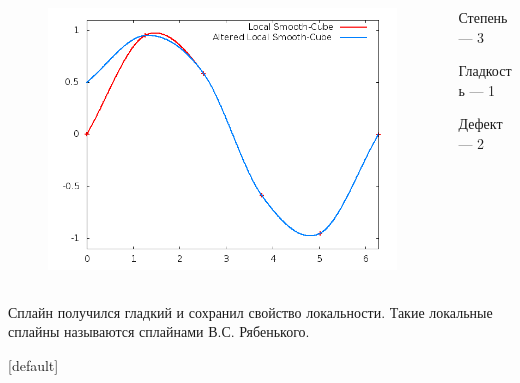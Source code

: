 \documentclass[professionalfonts,compress,unicode]{beamer}
\begin{document}
{
	
	\begin{columns}[c]
	\begin{column}{0.6\textwidth}
	\begin{figure}
	\center
	\includegraphics[width=\textwidth]{spline3_1.png}%
	\end{figure}
	\end{column}
	\begin{column}{0.4\textwidth}
	Степень --- 3
	
	Гладкость --- 1
	
	Дефект --- 2
	\end{column}
	\end{columns}

	Сплайн получился гладкий и сохранил свойство локальности. Такие локальные сплайны называются сплайнами В.С. Рябенького.
}
{
[default] 
}
\end{document}
